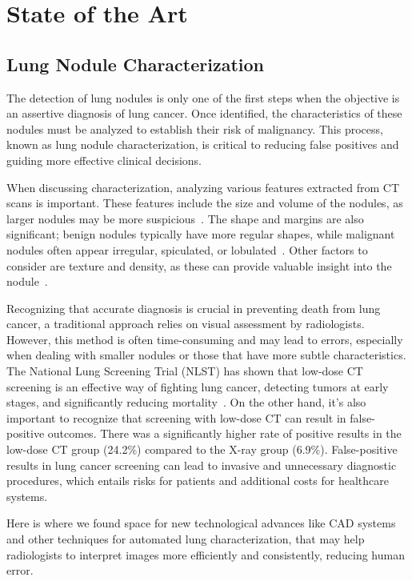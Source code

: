 \chapter{State of the Art}\label{chap:sota}

\section{Lung Nodule Characterization}

The detection of lung nodules is only one of the first steps when the objective is an assertive diagnosis of lung cancer. Once identified, the characteristics of these nodules must be analyzed to establish their risk of malignancy. This process, known as lung nodule characterization, is critical to reducing false positives and guiding more effective clinical decisions.

When discussing characterization, analyzing various features extracted from CT scans is important. These features include the size and volume of the nodules, as larger nodules may be more suspicious~\cite{Alksas2023}. The shape and margins are also significant; benign nodules typically have more regular shapes, while malignant nodules often appear irregular, spiculated, or lobulated~\cite{Shaffie2022}. Other factors to consider are texture and density, as these can provide valuable insight into the nodule~\cite{Alksas2023,Shaffie2022}.

Recognizing that accurate diagnosis is crucial in preventing death from lung cancer, a traditional approach relies on visual assessment by radiologists. However, this method is often time-consuming and may lead to errors, especially when dealing with smaller nodules or those that have more subtle characteristics. The National Lung Screening Trial (NLST) has shown that low-dose CT screening is an effective way of fighting lung cancer, detecting tumors at early stages, and significantly reducing mortality~\cite{NLST}. On the other hand, it's also important to recognize that screening with low-dose CT can result in false-positive outcomes. There was a significantly higher rate of positive results in the low-dose CT group (24.2\%) compared to the X-ray group (6.9\%).  False-positive results in lung cancer screening can lead to invasive and unnecessary diagnostic procedures, which entails risks for patients and additional costs for healthcare systems.

Here is where we found space for new technological advances like CAD systems and other techniques for automated lung characterization, that may help radiologists to interpret images more efficiently and consistently, reducing human error.


